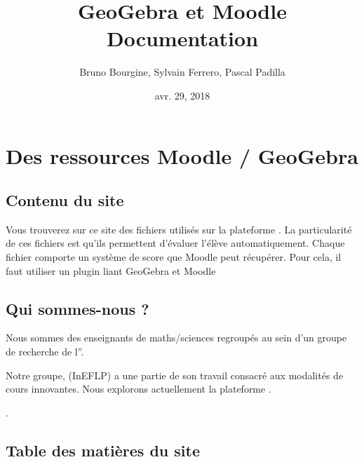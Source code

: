 \documentclass[letterpaper,10pt,french]{sphinxmanual}
\title{GeoGebra et Moodle Documentation}
\date{avr. 29, 2018}
\author{Bruno Bourgine, Sylvain Ferrero, Pascal Padilla}
\begin{document}
\maketitle
\sphinxtableofcontents
{}\label{\detokenize{index::doc}}



\chapter{Des ressources Moodle / GeoGebra}
\label{\detokenize{index:bienvenus-sur-nos-pages-geogebra-et-moodle}}\label{\detokenize{index:des-ressources-moodle-geogebra}}

\section{Contenu du site}
\label{\detokenize{index:contenu-du-site}}
Vous trouverez sur ce site des fichiers  utilisés sur la plateforme .
La particularité de ces fichiers est qu’ils permettent d’évaluer l’élève automatiquement.
Chaque fichier comporte un système de score que Moodle peut récupérer. Pour cela, il faut
utiliser un plugin liant GeoGebra et Moodle


\section{Qui sommes-nous ?}
\label{\detokenize{index:qui-sommes-nous}}
Nous sommes des enseignants de maths/sciences regroupés au sein d’un groupe de recherche
de l”.

Notre groupe,  (InEFLP)
a une partie de son travail consacré aux modalités de cours innovantes. Nous explorons
actuellement la plateforme .

.

\section{Table des matières du site}
\label{\detokenize{index:table-des-matieres-du-site}}
\end{document}
